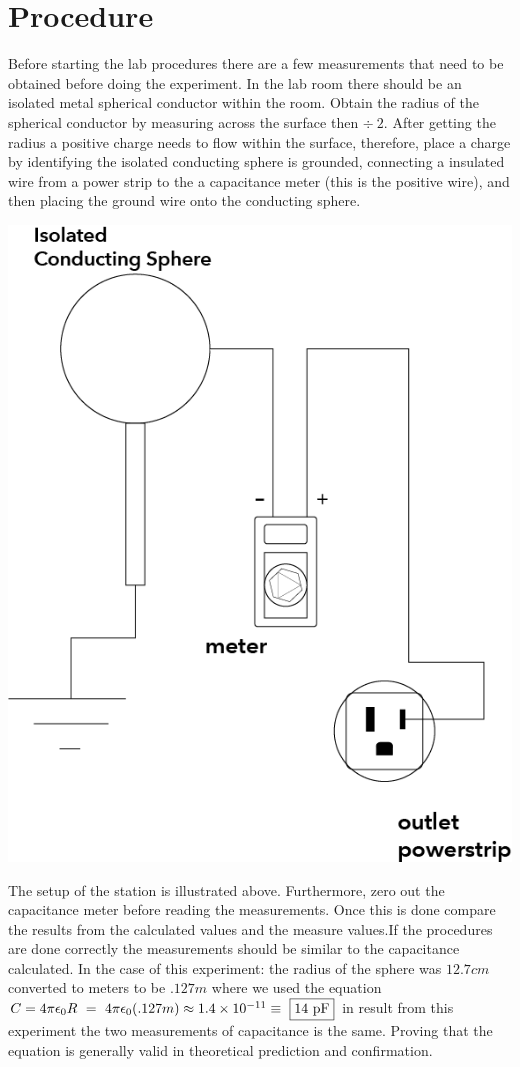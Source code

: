 \documentclass{article}
\begin{document}
\section*{Procedure}
Before starting the lab procedures there are a few measurements that need to be obtained before doing the experiment. In the lab room there should be an isolated metal spherical conductor within the room. Obtain the radius of the spherical conductor by measuring across the surface  then $\div \ 2$. After getting the radius a positive charge needs to flow within the surface, therefore, place a charge by identifying the isolated conducting sphere is grounded, connecting a insulated wire from a power strip to the a capacitance meter (this is the positive wire), and then placing the ground wire onto the conducting sphere. 
\begin{center}
    \includegraphics[scale=.25]{Images/isolatedsphere.png}
\end{center}
\break
The setup of the station is illustrated above. Furthermore, zero out the capacitance meter before reading the measurements. Once this is done compare the results from the calculated values and the measure values.If the procedures are done correctly the measurements should be similar to the capacitance calculated. In the case of this experiment: the radius of the sphere was $12.7 cm$ converted to meters to be $.127m$ where we used the equation $C = 4\pi\epsilon_{0}R \ = \ 4\pi\epsilon_{0}(.127m) \approx 1.4 \times 10^{-11} \equiv \ \fbox{14 pF}$ in result from this experiment the two measurements of capacitance is the same. Proving that the equation is generally valid in theoretical prediction and confirmation.
\vspace{1cm}
\end{document}
